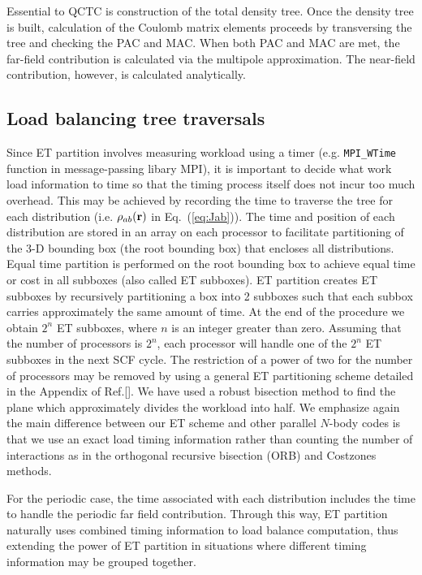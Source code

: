 \commentoutA{\documentclass[prl,aps,twocolumn,twocolumngrid,superbib]{revtex4}}
\begin{document}
Essential to QCTC is construction of the total density tree.  Once the
density tree is built, calculation of the Coulomb matrix elements
proceeds by transversing the tree and checking the PAC and MAC. When
both PAC and MAC are met, the far-field contribution is calculated via
the multipole approximation.  The near-field contribution, however, is
calculated analytically.

\subsection{Load balancing tree traversals}
\label{ETPartition}
Since ET partition involves measuring workload using a timer
(e.g. {\tt MPI\_WTime} function in message-passing libary
MPI\cite{mpi}), it is important to decide what work load information
to time so that the timing process itself does not incur too much
overhead.  This may be achieved by recording the time to traverse the
tree for each distribution (i.e. $\rho_{ab}({\bf r})$ in
Eq.~(\ref{eq:Jab})). The time and position of each distribution are
stored in an array on each processor to facilitate partitioning of the
3-D bounding box (the root bounding box) that encloses all
distributions. Equal time partition\cite{CGan03} is performed on the
root bounding box to achieve equal time or cost in all subboxes (also
called ET subboxes).  ET partition creates ET subboxes by recursively
partitioning a box into 2 subboxes such that each subbox carries
approximately the same amount of time. At the end of the procedure we
obtain $2^n$ ET subboxes, where $n$ is an integer greater than zero.
Assuming that the number of processors is $2^n$, each processor will
handle one of the $2^n$ ET subboxes in the next SCF cycle.  The
restriction of a power of two for the number of processors may be
removed by using a general ET partitioning scheme detailed in the
Appendix of Ref.[].  We have used a robust
bisection method\cite{WPress92} to find the plane which approximately
divides the workload into half.  We emphasize again the main
difference between our ET scheme and other parallel $N$-body
codes\cite{MWarren92,Singh93} is that we use an exact load timing
information rather than counting the number of interactions as in the
orthogonal recursive bisection (ORB)\cite{MWarren92} and Costzones
methods\cite{Singh93}.

For the periodic case, the time associated with each distribution
includes the time to handle the periodic far
field\cite{MChallacombe97D,CTymczak04a} contribution. Through this
way, ET partition naturally uses combined timing information to load
balance computation, thus extending the power of ET partition in
situations where different timing information may be grouped together.
\end{document}
